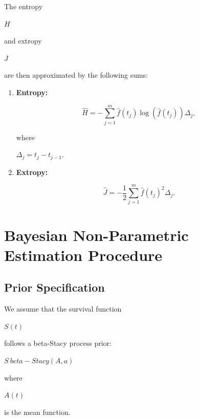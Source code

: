 \documentclass[10pt,twoside]{article}
\numberwithin{equation}{section}
\begin{document}
The entropy 

$H$ 

and extropy 

$J$ 

are then approximated by the following sums: 

\begin{enumerate}

\item

\textbf{Entropy:}

\begin{equation*}

\hat{H} = - \sum_{j=1}^{m} \hat{f}(t_j) \log(\hat{f}(t_j)) \Delta_{j},

\end{equation*}

where

$\Delta_{j} = t_j - t_{j-1}$.

\item

\textbf{Extropy:}

\begin{equation*}

\hat{J} = -\frac{1}{2} \sum_{j=1}^{m} \hat{f}(t_j)^{2} \Delta_j

.

\end{equation*}

\end{enumerate}




\section{Bayesian Non-Parametric Estimation Procedure}



\subsection{Prior Specification}

We assume that the survival function 

$S(t)$

follows a beta-Stacy process prior:

$S ~ beta-Stacy(A, a)$

where 

$A(t)$ 

is the mean function. 
\end{document}
